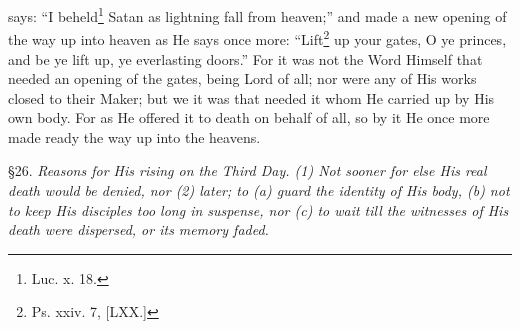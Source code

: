 says: “I beheld\footnote{Luc. x. 18.} Satan as lightning fall from heaven;” and made a new opening of the way up into heaven as He says once more: “Lift\footnote{Ps. xxiv. 7, [LXX.]} up your gates, O ye princes, and be ye lift up, ye everlasting doors.” For it was not the Word Himself that needed an opening of the gates, being Lord of all; nor were any of His works closed to their Maker; but we it was that needed it whom He carried up by His own body. For as He offered it to death on behalf of all, so by it He once more made ready the way up into the heavens.


§26. \emph{Reasons for His rising on the Third Day. (1) Not sooner for else His real death would be denied, nor (2) later; to (a) guard the identity of His body, (b) not to keep His disciples too long in suspense, nor (c) to wait till the witnesses of His death were dispersed, or its memory faded.}

